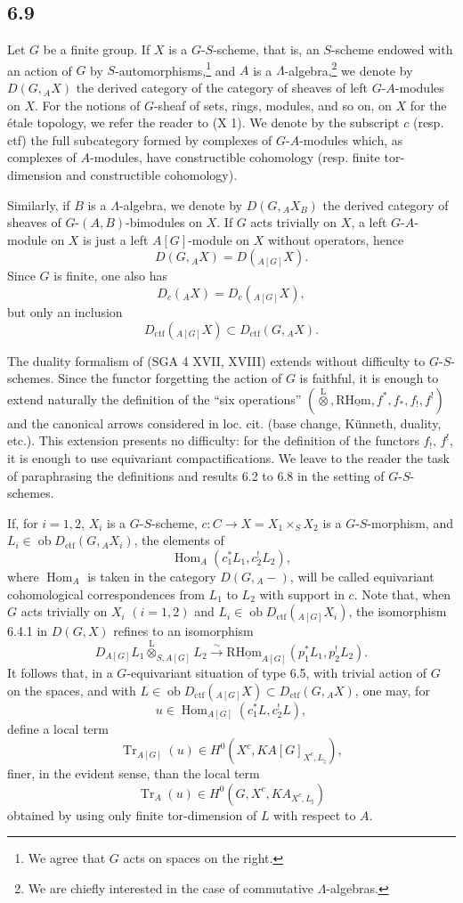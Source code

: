 \documentclass[11pt]{article}
\DeclareMathOperator{\Hom}{Hom}
\providecommand{\Tr}{\operatorname{Tr}}
\providecommand{\Tr}{\operatorname{Tr}}
\providecommand{\lten}{\overset{\mathrm L}{\otimes}}
\providecommand{\Ob}{\operatorname{ob}}
\providecommand{\Tr}{\operatorname{Tr}}
\providecommand{\Hom}{\operatorname{Hom}}
\providecommand{\lten}{\overset{\mathrm L}{\otimes}}
\providecommand{\lten}{\overset{\mathrm L}{\otimes}}
\providecommand{\Ob}{\operatorname{ob}}
\providecommand{\Tr}{\operatorname{Tr}}
\providecommand{\lten}{\overset{\mathrm L}{\otimes}}
\providecommand{\lten}{\overset{\mathrm L}{\otimes}}
\providecommand{\Ob}{\operatorname{Ob}}
\providecommand{\lten}{\overset{\mathrm L}{\otimes}}
\providecommand{\Hom}{\operatorname{Hom}}
\providecommand{\Tr}{\operatorname{Tr}}
\providecommand{\Ob}{\operatorname{ob}}
\providecommand{\Ob}{\operatorname{Ob}}
\providecommand{\lten}{\overset{\mathrm L}{\otimes}}
\begin{document}
\subsection*{6.9}
Let $G$ be a finite group. If $X$ is a $G$-$S$-scheme, that is, an $S$-scheme endowed with an action of $G$ by $S$-automorphisms,\footnote{We agree that $G$ acts on spaces on the right.} and $A$ is a $\Lambda$-algebra,\footnote{We are chiefly interested in the case of commutative $\Lambda$-algebras.} we denote by $D(G,{}_AX)$ the derived category of the category of sheaves of left $G$-$A$-modules on $X$. For the notions of $G$-sheaf of sets, rings, modules, and so on, on $X$ for the étale topology, we refer the reader to (X 1). We denote by the subscript $c$ (resp. ctf) the full subcategory formed by complexes of $G$-$A$-modules which, as complexes of $A$-modules, have constructible cohomology (resp. finite tor-dimension and constructible cohomology).

Similarly, if $B$ is a $\Lambda$-algebra, we denote by $D(G,{}_AX_B)$ the derived category of sheaves of $G$-$(A,B)$-bimodules on $X$. If $G$ acts trivially on $X$, a left $G$-$A$-module on $X$ is just a left $A[G]$-module on $X$ without operators, hence
\[
D(G,{}_AX)=D({}_{A[G]}X).
\]
Since $G$ is finite, one also has
\[
D_c({}_AX)=D_c({}_{A[G]}X),
\]
but only an inclusion
\[
D_{\mathrm{ctf}}({}_{A[G]}X)\subset D_{\mathrm{ctf}}(G,{}_AX).
\]

The duality formalism of (SGA 4 XVII, XVIII) extends without difficulty to $G$-$S$-schemes. Since the functor forgetting the action of $G$ is faithful, it is enough to extend naturally the definition of the “six operations” $(\lten,\mathrm{R}\underline{\mathrm{Hom}},f^*,f_*,f_!,f^!)$ and the canonical arrows considered in loc. cit. (base change, Künneth, duality, etc.). This extension presents no difficulty: for the definition of the functors $f_!$, $f^!$, it is enough to use equivariant compactifications. We leave to the reader the task of paraphrasing the definitions and results 6.2 to 6.8 in the setting of $G$-$S$-schemes.

If, for $i=1,2$, $X_i$ is a $G$-$S$-scheme, $c:C\to X=X_1\times_SX_2$ is a $G$-$S$-morphism, and $L_i\in\Ob D_{\mathrm{ctf}}(G,{}_AX_i)$, the elements of
\[
\Hom_A(c_1^*L_1,c_2^!L_2),
\]
where $\Hom_A$ is taken in the category $D(G,{}_A-)$, will be called equivariant cohomological correspondences from $L_1$ to $L_2$ with support in $c$. Note that, when $G$ acts trivially on $X_i$ $(i=1,2)$ and $L_i\in\Ob D_{\mathrm{ctf}}({}_{A[G]}X_i)$, the isomorphism 6.4.1 in $D(G,X)$ refines to an isomorphism
\[
D_{A[G]}L_1\lten_{S,A[G]}L_2
\xrightarrow{\sim}
\mathrm{R}\underline{\mathrm{Hom}}_{A[G]}(p_1^*L_1,p_2^!L_2).
\]
It follows that, in a $G$-equivariant situation of type 6.5, with trivial action of $G$ on the spaces, and with $L\in\Ob D_{\mathrm{ctf}}({}_{A[G]}X)\subset D_{\mathrm{ctf}}(G,{}_AX)$, one may, for
\[
u\in\Hom_{A[G]}(c_1^*L,c_2^!L),
\]
define a local term
\[
\Tr_{A[G]}(u)\in H^0(X^c,KA[G]_{X^c,L_{\natural}}),
\]
finer, in the evident sense, than the local term
\[
\Tr_A(u)\in H^0(G,X^c,KA_{X^c,L_{\natural}})
\]
obtained by using only finite tor-dimension of $L$ with respect to $A$.
\end{document}
